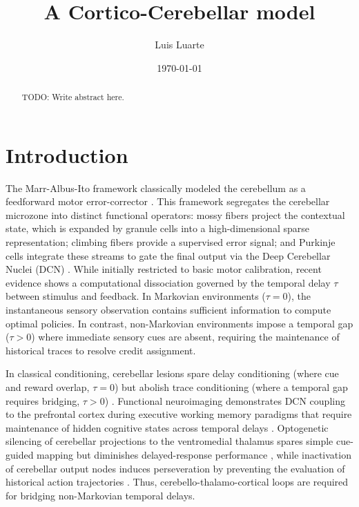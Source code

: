 \documentclass[12pt, a4paper]{extarticle}
\title{A Cortico-Cerebellar model}
\author{Luis Luarte}
\date{\today}
\begin{document}
\maketitle

\begin{abstract}
    TODO: Write abstract here.
\end{abstract}
	
	\section{Introduction}
	The Marr-Albus-Ito framework classically modeled the cerebellum as a feedforward motor error-corrector \parencite{marrTheoryCerebellarCortex1969, albusTheoryCerebellarFunction1971, itoControlMentalActivities2008}. This framework segregates the cerebellar microzone into distinct functional operators: mossy fibers project the contextual state, which is expanded by granule cells into a high-dimensional sparse representation; climbing fibers provide a supervised error signal; and Purkinje cells integrate these streams to gate the final output via the Deep Cerebellar Nuclei (DCN) \parencite{deanCerebellarMicrocircuitAdaptive2010, appsAnatomicalPhysiologicalFoundations2005}. While initially restricted to basic motor calibration, recent evidence shows a computational dissociation governed by the temporal delay $\tau$ between stimulus and feedback. In Markovian environments ($\tau = 0$), the instantaneous sensory observation contains sufficient information to compute optimal policies. In contrast, non-Markovian environments impose a temporal gap ($\tau > 0$) where immediate sensory cues are absent, requiring the maintenance of historical traces to resolve credit assignment.
	
	In classical conditioning, cerebellar lesions spare delay conditioning (where cue and reward overlap, $\tau = 0$) but abolish trace conditioning (where a temporal gap requires bridging, $\tau > 0$) \parencite{tsengSensoryPredictionErrors2007}. Functional neuroimaging demonstrates DCN coupling to the prefrontal cortex during executive working memory paradigms that require maintenance of hidden cognitive states across temporal delays \parencite{habasDistinctCerebellarContributions2009, bucknerOrganizationHumanCerebellum2011}. Optogenetic silencing of cerebellar projections to the ventromedial thalamus spares simple cue-guided mapping but diminishes delayed-response performance \parencite{gaoCorticocerebellarLoopMotor2018}, while inactivation of cerebellar output nodes induces perseveration by preventing the evaluation of historical action trajectories \parencite{chabrolCerebellarContributionPreparatory2019}. Thus, cerebello-thalamo-cortical loops are required for bridging non-Markovian temporal delays.
	
\end{document}
